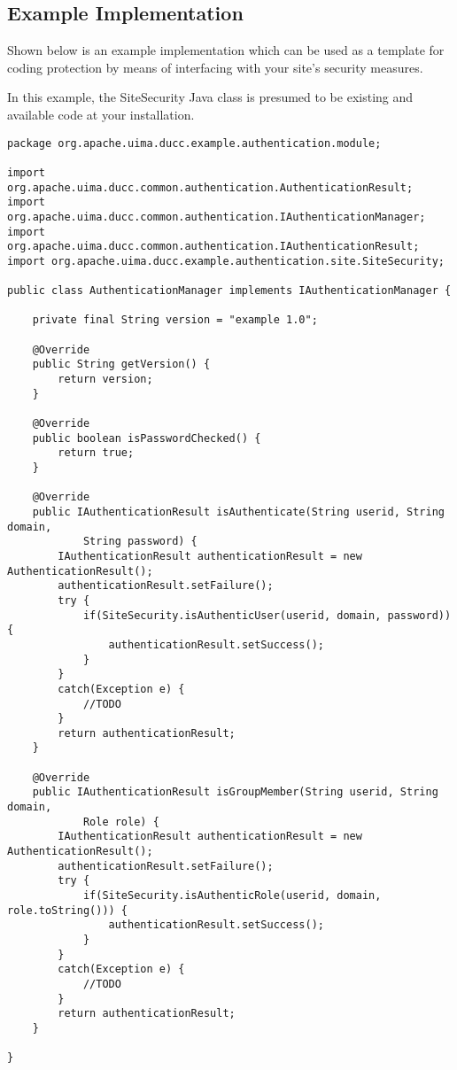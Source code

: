 \subsection{Example Implementation}
    \begin{description}
    
    Shown below is an example implementation which can be used as a template
    for coding protection by means of interfacing with your site's security
    measures.
    
    In this example, the SiteSecurity Java class is presumed to be existing
    and available code at your installation.
    
    \begin{verbatim}
package org.apache.uima.ducc.example.authentication.module;

import org.apache.uima.ducc.common.authentication.AuthenticationResult;
import org.apache.uima.ducc.common.authentication.IAuthenticationManager;
import org.apache.uima.ducc.common.authentication.IAuthenticationResult;
import org.apache.uima.ducc.example.authentication.site.SiteSecurity;

public class AuthenticationManager implements IAuthenticationManager {

    private final String version = "example 1.0";
    
    @Override
    public String getVersion() {
        return version;
    }

    @Override
    public boolean isPasswordChecked() {
        return true;
    }

    @Override
    public IAuthenticationResult isAuthenticate(String userid, String domain,
            String password) {
        IAuthenticationResult authenticationResult = new AuthenticationResult();
        authenticationResult.setFailure();
        try {
            if(SiteSecurity.isAuthenticUser(userid, domain, password)) {
                authenticationResult.setSuccess();
            }
        }
        catch(Exception e) {
            //TODO
        }
        return authenticationResult;
    }

    @Override
    public IAuthenticationResult isGroupMember(String userid, String domain,
            Role role) {
        IAuthenticationResult authenticationResult = new AuthenticationResult();
        authenticationResult.setFailure();
        try {
            if(SiteSecurity.isAuthenticRole(userid, domain, role.toString())) {
                authenticationResult.setSuccess();
            }
        }
        catch(Exception e) {
            //TODO
        }
        return authenticationResult;
    }

}
    \end{verbatim}
    \end{description}
        
